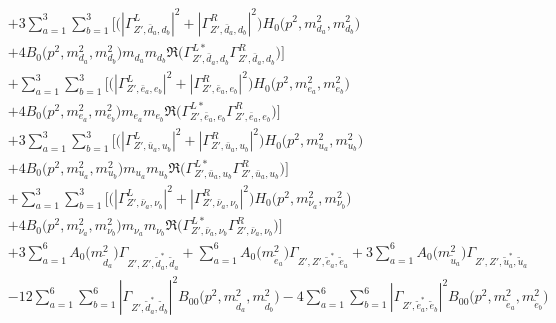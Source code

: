 \begin{itemize}
\begin{align}
 &+3 \sum_{a=1}^{3}\sum_{b=1}^{3} \Big[\Big(|{\Gamma^L_{{Z'},\bar{d}_{{a}},d_{{b}}}}|^2 + |{\Gamma^R_{{Z'},\bar{d}_{{a}},d_{{b}}}}|^2\Big){H_0\Big(p^{2},m^2_{d_{{a}}},m^2_{d_{{b}}}\Big)} \nonumber \\ & +4 {B_0\Big(p^{2},m^2_{d_{{a}}},m^2_{d_{{b}}}\Big)} m_{d_{{a}}} m_{d_{{b}}} {\Re\Big({\Gamma^{L*}_{{Z'},\bar{d}_{{a}},d_{{b}}}} {\Gamma^R_{{Z'},\bar{d}_{{a}},d_{{b}}}} \Big)} \Big] \nonumber \\ 
 &+\sum_{a=1}^{3}\sum_{b=1}^{3} \Big[\Big(|{\Gamma^L_{{Z'},\bar{e}_{{a}},e_{{b}}}}|^2 + |{\Gamma^R_{{Z'},\bar{e}_{{a}},e_{{b}}}}|^2\Big){H_0\Big(p^{2},m^2_{e_{{a}}},m^2_{e_{{b}}}\Big)} \nonumber \\ & +4 {B_0\Big(p^{2},m^2_{e_{{a}}},m^2_{e_{{b}}}\Big)} m_{e_{{a}}} m_{e_{{b}}} {\Re\Big({\Gamma^{L*}_{{Z'},\bar{e}_{{a}},e_{{b}}}} {\Gamma^R_{{Z'},\bar{e}_{{a}},e_{{b}}}} \Big)} \Big]\nonumber \\ 
 &+3 \sum_{a=1}^{3}\sum_{b=1}^{3} \Big[\Big(|{\Gamma^L_{{Z'},\bar{u}_{{a}},u_{{b}}}}|^2 + |{\Gamma^R_{{Z'},\bar{u}_{{a}},u_{{b}}}}|^2\Big){H_0\Big(p^{2},m^2_{u_{{a}}},m^2_{u_{{b}}}\Big)} \nonumber \\ & +4 {B_0\Big(p^{2},m^2_{u_{{a}}},m^2_{u_{{b}}}\Big)} m_{u_{{a}}} m_{u_{{b}}} {\Re\Big({\Gamma^{L*}_{{Z'},\bar{u}_{{a}},u_{{b}}}} {\Gamma^R_{{Z'},\bar{u}_{{a}},u_{{b}}}} \Big)} \Big] \nonumber \\ 
 &+\sum_{a=1}^{3}\sum_{b=1}^{3} \Big[\Big(|{\Gamma^L_{{Z'},\bar{\nu}_{{a}},\nu_{{b}}}}|^2 + |{\Gamma^R_{{Z'},\bar{\nu}_{{a}},\nu_{{b}}}}|^2\Big){H_0\Big(p^{2},m^2_{\nu_{{a}}},m^2_{\nu_{{b}}}\Big)} \nonumber \\ & +4 {B_0\Big(p^{2},m^2_{\nu_{{a}}},m^2_{\nu_{{b}}}\Big)} m_{\nu_{{a}}} m_{\nu_{{b}}} {\Re\Big({\Gamma^{L*}_{{Z'},\bar{\nu}_{{a}},\nu_{{b}}}} {\Gamma^R_{{Z'},\bar{\nu}_{{a}},\nu_{{b}}}} \Big)} \Big]\nonumber \\ 
 &+3 \sum_{a=1}^{6}{A_0\Big(m^2_{\tilde{d}_{{a}}}\Big)} {\Gamma_{{Z'},{Z'},\tilde{d}^*_{{a}},\tilde{d}_{{a}}}}  +\sum_{a=1}^{6}{A_0\Big(m^2_{\tilde{e}_{{a}}}\Big)} {\Gamma_{{Z'},{Z'},\tilde{e}^*_{{a}},\tilde{e}_{{a}}}} +3 \sum_{a=1}^{6}{A_0\Big(m^2_{\tilde{u}_{{a}}}\Big)} {\Gamma_{{Z'},{Z'},\tilde{u}^*_{{a}},\tilde{u}_{{a}}}}  \nonumber \\ 
 &-12 \sum_{a=1}^{6}\sum_{b=1}^{6}|{\Gamma_{{Z'},\tilde{d}^*_{{a}},\tilde{d}_{{b}}}}|^2 {B_{00}\Big(p^{2},m^2_{\tilde{d}_{{a}}},m^2_{\tilde{d}_{{b}}}\Big)}  -4 \sum_{a=1}^{6}\sum_{b=1}^{6}|{\Gamma_{{Z'},\tilde{e}^*_{{a}},\tilde{e}_{{b}}}}|^2 {B_{00}\Big(p^{2},m^2_{\tilde{e}_{{a}}},m^2_{\tilde{e}_{{b}}}\Big)}  \nonumber \\ 

\end{align}
\end{itemize}
